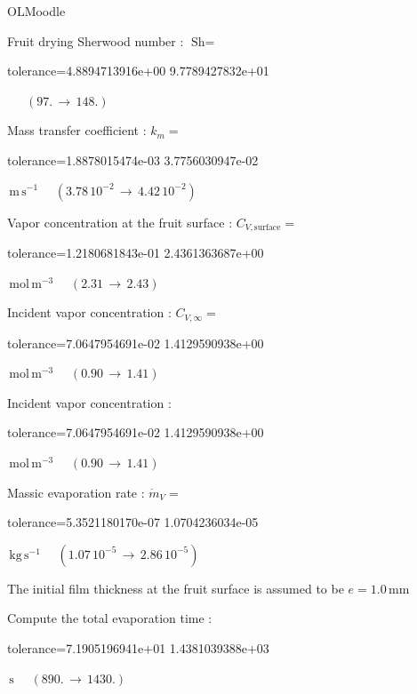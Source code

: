 \documentclass[12pt]{article}
\begin{document}
\begin{quiz}{OLMoodle}
\begin{cloze}{Fruit drying}
Sherwood number : $\text{Sh} =  $
\begin{numerical}[points=2] 
\item[tolerance={4.8894713916e+00}] 9.7789427832e+01 
\end{numerical} 
 $\,$ 
 $ \quad (97. \, \rightarrow \, 148.) $ 

Mass transfer coefficient : $k_m =  $
\begin{numerical}[points=1] 
\item[tolerance={1.8878015474e-03}] 3.7756030947e-02 
\end{numerical} 
 $\,  \mathrm{m}\,  \mathrm{s}^{-1}$ 
 $ \quad ( 3.78 \, 10^{-2}  \, \rightarrow \,  4.42 \, 10^{-2} ) $ 

Vapor concentration at the fruit surface : $C_{V, \text{surface}} =  $
\begin{numerical}[points=2] 
\item[tolerance={1.2180681843e-01}] 2.4361363687e+00 
\end{numerical} 
 $\,  \mathrm{mol}\,  \mathrm{m}^{-3}$ 
 $ \quad (2.31 \, \rightarrow \, 2.43) $ 

Incident  vapor concentration : $C_{V, \infty} =  $
\begin{numerical}[points=2] 
\item[tolerance={7.0647954691e-02}] 1.4129590938e+00 
\end{numerical} 
 $\,  \mathrm{mol}\,  \mathrm{m}^{-3}$ 
 $ \quad (0.90 \, \rightarrow \, 1.41) $ 

Incident  vapor concentration : 
\begin{numerical}[points=2] 
\item[tolerance={7.0647954691e-02}] 1.4129590938e+00 
\end{numerical} 
 $\,  \mathrm{mol}\,  \mathrm{m}^{-3}$ 
 $ \quad (0.90 \, \rightarrow \, 1.41) $ 

Massic evaporation rate : $\dot{m}_V =  $
\begin{numerical}[points=1] 
\item[tolerance={5.3521180170e-07}] 1.0704236034e-05 
\end{numerical} 
 $\,  \mathrm{kg}\,  \mathrm{s}^{-1}$ 
 $ \quad ( 1.07 \, 10^{-5}  \, \rightarrow \,  2.86 \, 10^{-5} ) $ 

 

The initial film thickness at the fruit surface is assumed to be $e = 1.0\,  \mathrm{mm} $

Compute the total evaporation time : 
\begin{numerical}[points=2] 
\item[tolerance={7.1905196941e+01}] 1.4381039388e+03 
\end{numerical} 
 $\,  \mathrm{s}$ 
 $ \quad (890. \, \rightarrow \, 1430.) $ 

\end{cloze} 


\end{quiz}
\end{document}
